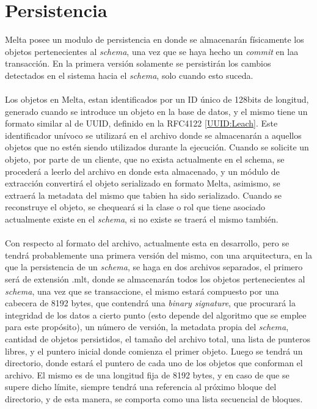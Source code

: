 \documentclass{melta}
\begin{document}
\section{Persistencia}
\label{sec:persistencia}
Melta posee un modulo de persistencia en donde se almacenarán físicamente los objetos pertenecientes al \textit{schema}, una vez que se haya hecho un \textit{commit} en laa transacción. En la primera versión solamente se persistirán los cambios detectados en el sistema hacia el \textit{schema}, solo cuando esto suceda. 
\\\\
Los objetos en Melta, estan identificados por un ID único de 128bits de longitud, generado cuando se introduce un objeto en la base de datos, y el mismo tiene un formato similar al de UUID, definido en la RFC4122 \ref{UUID:Leach}. Este identificador unívoco se utilizará en el archivo donde se almacenarán a aquellos objetos que no estén siendo utilizados durante la ejecución. Cuando se solicite un objeto, por parte de un cliente, que no exista actualmente en el schema, se procederá a leerlo del archivo en donde esta almacenado, y un módulo de extracción convertirá el objeto serializado en formato Melta, asimismo, se extraerá la metadata del mismo que tabien ha sido serializado. Cuando se reconstruye el objeto, se chequeará si la clase o rol que tiene asociado actualmente existe en el \textit{schema}, si no existe se traerá el mismo también.
\\\\
Con respecto al formato del archivo, actualmente esta en desarrollo, pero se tendrá probablemente una primera versión del mismo, con una arquitectura, en la que la persistencia de un \textit{schema}, se haga en dos archivos separados, el primero será de extensión .mlt, donde se almacenarán todos los objetos pertenecientes al \textit{schema}, una vez que se transaccione, el mismo estará compuesto por una cabecera de 8192 bytes, que contendrá una \textit{binary signature}, que procurará la integridad de los datos a cierto punto (esto depende del algoritmo que se emplee para este propósito), un número de versión, la metadata propia del \textit{schema}, cantidad de objetos persistidos, el tamaño del archivo total, una lista de punteros libres, y el puntero inicial donde comienza el primer objeto. Luego se tendrá un directorio, donde estará el puntero de cada uno de los objetos que conforman el archivo. El mismo es de una longitud fija de 8192 bytes, y en caso de que se supere dicho límite, siempre tendrá una referencia al próximo bloque del directorio, y de esta manera, se comporta como una lista secuencial de bloques.
\end{document}
